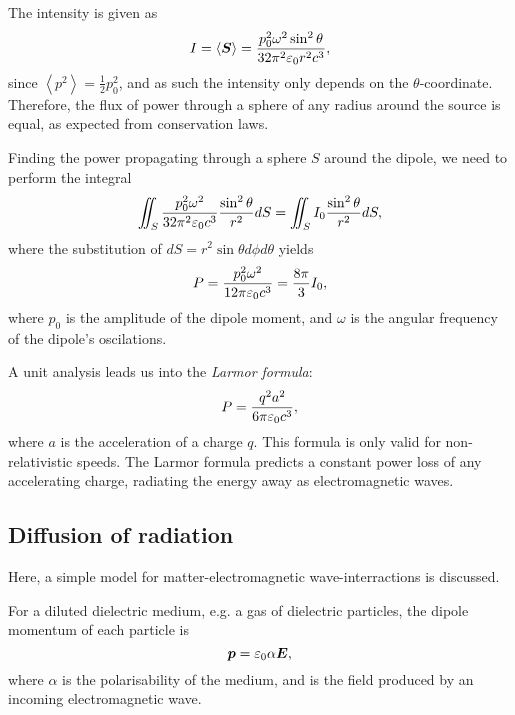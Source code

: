        The intensity is given as 
        \begin{equation}
            I = \left<\bm{S}\right> = \frac{p_0^2\omega^2\sin^2\theta}{32\pi^2\varepsilon_0 r^2 c^3},
        \end{equation}
        since $\left<p^2\right> = \frac{1}{2}p_0^2$, and as such the intensity only depends on the $\theta$-coordinate. 
        Therefore, the flux of power through a sphere of any radius around the source is equal, as expected from conservation laws. 

        Finding the power propagating through a sphere $S$ around the dipole, we need to perform the integral 
        \begin{equation*}
            \iint_S \frac{p_0^2\omega^2}{32\pi^2\varepsilon_0 c^3} \frac{\sin^2\theta}{r^2} dS = \iint_S I_0\frac{\sin^2\theta}{r^2} dS,
        \end{equation*}
        where the substitution of $dS = r^2\sin\theta d\phi d\theta$ yields 
        \begin{equation}
            P = \frac{p_0^2\omega^2}{12\pi\varepsilon_0 c^3} = \frac{8\pi}{3}I_0,
        \end{equation}
        where $p_0$ is the amplitude of the dipole moment, and $\omega$ is the angular frequency of the dipole's oscilations.

        A unit analysis leads us into the \textit{Larmor formula}:
        \begin{equation}
            P = \frac{q^2a^2}{6\pi\varepsilon_0 c^3},
        \end{equation}
        where $a$ is the acceleration of a charge $q$. This formula is only valid for non-relativistic speeds. 
        The Larmor formula predicts a constant power loss of any accelerating charge, radiating the energy away as electromagnetic waves.

\subsection{Diffusion of radiation}
    Here, a simple model for matter-electromagnetic wave-interractions is discussed. 

    For a diluted dielectric medium, e.g. a gas of dielectric particles, the dipole momentum of each particle is 
    \begin{equation}
        \bm{p} = \varepsilon_0\alpha\bm{E},
    \end{equation}
    where $\alpha$ is the polarisability of the medium, and \E{} is the field produced by an incoming electromagnetic wave. 
